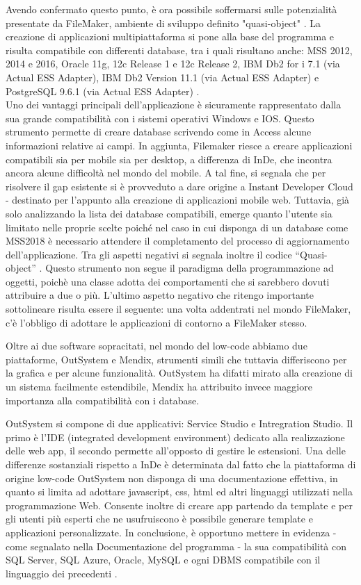 Avendo confermato questo punto, è ora possibile soffermarsi sulle potenzialità presentate da FileMaker, ambiente di sviluppo definito "quasi-object" \hyperref[bib21]{\cite{[21]}}. 
La creazione di applicazioni multipiattaforma si pone alla base del programma e risulta compatibile con differenti database, tra i quali risultano anche: MSS 2012, 2014 e 2016, 
Oracle 11g, 12c Release 1 e 12c Release 2, IBM Db2 for i 7.1 (via Actual ESS Adapter), IBM Db2 Version 11.1 (via Actual ESS Adapter) e PostgreSQL 9.6.1 (via Actual ESS Adapter) \hyperref[bib24]{\cite{[24]}}.\\
Uno dei vantaggi principali dell'applicazione è sicuramente rappresentato dalla sua grande compatibilità con i sistemi operativi Windows e IOS. 
Questo strumento permette di creare database scrivendo come in Access alcune informazioni relative ai campi. In aggiunta, Filemaker riesce a creare applicazioni compatibili sia per mobile sia per desktop, a differenza di InDe, che incontra ancora alcune difficoltà nel mondo del mobile.
A tal fine, si segnala che per risolvere il gap esistente si è provveduto a dare origine a Instant Developer Cloud - destinato per l'appunto alla creazione di applicazioni mobile web.
Tuttavia, già solo analizzando la lista dei database compatibili, emerge quanto l'utente sia limitato nelle proprie scelte poiché nel caso in cui disponga di un database come MSS2018 è necessario attendere il completamento del processo di aggiornamento dell'applicazione. 
Tra gli aspetti negativi si segnala inoltre il codice “Quasi-object” . Questo strumento non segue il paradigma della programmazione ad oggetti, poichè una classe adotta dei comportamenti che si sarebbero dovuti attribuire a due o più.
L'ultimo aspetto negativo che ritengo importante sottolineare risulta essere il seguente: una volta addentrati nel mondo FileMaker, c'è l'obbligo di adottare le applicazioni di contorno a FileMaker stesso. 


Oltre ai due software sopracitati, nel mondo del low-code abbiamo due piattaforme, OutSystem e Mendix, strumenti simili che tuttavia differiscono per la grafica e per alcune funzionalità. 
OutSystem ha difatti mirato alla creazione di un sistema facilmente estendibile, Mendix ha attribuito invece maggiore importanza alla compatibilità con i database.

OutSystem si compone di due applicativi: Service Studio e Intregration Studio. Il primo è l'IDE (integrated development environment) dedicato alla realizzazione delle web app, il secondo permette all'opposto di gestire le estensioni.
Una delle differenze sostanziali rispetto a InDe è determinata dal fatto che la piattaforma di origine low-code OutSystem non disponga di una documentazione effettiva, in quanto si limita ad adottare javascript, css, html ed altri linguaggi utilizzati nella programmazione Web. 
Consente inoltre di creare app partendo da template e per gli utenti più esperti che ne usufruiscono è possibile generare template e applicazioni personalizzate.
In conclusione, è opportuno mettere in evidenza - come segnalato nella Documentazione del programma - la sua compatibilità con SQL Server, SQL Azure, Oracle, MySQL e ogni DBMS compatibile con il linguaggio dei precedenti \hyperref[bib25]{\cite{[25]}}. 


